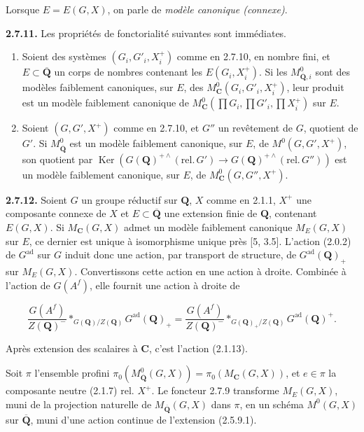\documentclass[10pt,a4paper]{article}
\begin{document}
Lorsque \(E=E(G,X)\), on parle de \emph{modèle canonique (connexe)}.

\textbf{2.7.11.} Les propriétés de fonctorialité suivantes sont immédiates.

\begin{enumerate}
\def\labelenumi{(\alph{enumi})}
\item
  Soient des systèmes \((G_i,G'_i,X_i^+)\) comme en 2.7.10, en nombre fini, et \(E\subset\overline{\mathbf Q}\) un corps de nombres contenant les \(E(G_i,X_i^+)\). Si les \(M^0_{\overline{\mathbf Q},i}\) sont des modèles faiblement canoniques, sur \(E\), des \(M^0_{\mathbf C}(G_i,G'_i,X_i^+)\), leur produit est un modèle faiblement canonique de \(M^0_{\mathbf C}(\prod G_i,\prod G'_i,\prod X_i^+)\) sur \(E\).
\item
  Soient \((G,G',X^+)\) comme en 2.7.10, et \(G''\) un revêtement de \(G\), quotient de \(G'\). Si \(M^0_{\overline{\mathbf Q}}\) est un modèle faiblement canonique, sur \(E\), de \(M^0(G,G',X^+)\), son quotient par \(\operatorname{Ker}(G(\mathbf Q)^{+\wedge}(\mathrm{rel.}\,G')\to G(\mathbf Q)^{+\wedge}(\mathrm{rel.}\,G''))\) est un modèle faiblement canonique, sur \(E\), de \(M^0_{\mathbf C}(G,G'',X^+)\).
\end{enumerate}

\textbf{2.7.12.} Soient \(G\) un groupe réductif sur \(\mathbf Q\), \(X\) comme en 2.1.1, \(X^+\) une composante connexe de \(X\) et \(E\subset\overline{\mathbf Q}\) une extension finie de \(\mathbf Q\), contenant \(E(G,X)\). Si \(M_{\mathbf C}(G,X)\) admet un modèle faiblement canonique \(M_E(G,X)\) sur \(E\), ce dernier est unique à isomorphisme unique près {[}5, 3.5{]}. L'action (2.0.2) de \(G^{\mathrm{ad}}\) sur \(G\) induit donc une action, par transport de structure, de \(G^{\mathrm{ad}}(\mathbf Q)_+\) sur \(M_E(G,X)\). Convertissons cette action en une action à droite. Combinée à l'action de \(G(A^f)\), elle fournit une action à droite de

\[
\frac{G(A^f)}{Z(\mathbf Q)^{-}}*_{G(\mathbf Q)/Z(\mathbf Q)}G^{\mathrm{ad}}(\mathbf Q)_+
=
\frac{G(A^f)}{Z(\mathbf Q)^{-}}*_{G(\mathbf Q)_+/Z(\mathbf Q)}G^{\mathrm{ad}}(\mathbf Q)^+.
\]

Après extension des scalaires à \(\mathbf C\), c'est l'action (2.1.13).

Soit \(\pi\) l'ensemble profini \(\pi_0(M^0_{\overline{\mathbf Q}}(G,X))=\pi_0(M_{\mathbf C}(G,X))\), et \(e\in\pi\) la composante neutre (2.1.7) rel. \(X^+\). Le foncteur 2.7.9 transforme \(M_E(G,X)\), muni de la projection naturelle de \(M_{\overline{\mathbf Q}}(G,X)\) dans \(\pi\), en un schéma \(M^0(G,X)\) sur \(\overline{\mathbf Q}\), muni d'une action continue de l'extension (2.5.9.1).
\end{document}
